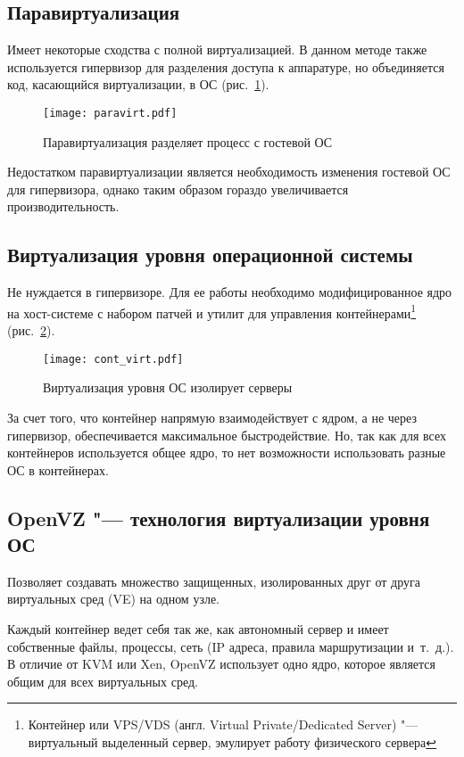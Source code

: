 \subsection{Паравиртуализация}
Имеет некоторые сходства с полной виртуализацией. 
В данном методе также используется гипервизор для разделения доступа к аппаратуре, но объединяется код, касающийся виртуализации, в ОС \cite{virtuallinux} (рис.~\ref{pic:paravirt}).
\begin{figure}[ht]
    \centering
	\texttt{[image: paravirt.pdf]}
	\caption{Паравиртуализация разделяет процесс с гостевой ОС}\label{pic:paravirt}
\end{figure}

Недостатком паравиртуализации является необходимость изменения гостевой ОС для гипервизора, однако таким образом гораздо увеличивается производительность.

\subsection{Виртуализация уровня операционной системы}
Не нуждается в гипервизоре. 
Для ее работы необходимо модифицированное ядро на хост-системе с набором патчей и утилит для управления контейнерами\footnote{Контейнер или VPS/VDS (англ. Virtual Private/Dedicated Server) "--- виртуальный выделенный сервер, эмулирует работу физического сервера} (рис.~\ref{pic:cont_virt}).
\begin{figure}[ht]
    \centering
	\texttt{[image: cont\_virt.pdf]}
	\caption{Виртуализация уровня ОС изолирует серверы}\label{pic:cont_virt}
\end{figure}

За счет того, что контейнер напрямую взаимодействует с ядром, а не через гипервизор, обеспечивается максимальное быстродействие. Но, так как для всех контейнеров используется общее ядро, то нет возможности использовать разные ОС в контейнерах.

\subsection{OpenVZ "--- технология виртуализации уровня ОС}
Позволяет создавать множество защищенных, изолированных друг от друга виртуальных сред (VE) на одном узле. 

Каждый контейнер ведет себя так же, как автономный сервер и имеет собственные файлы, процессы, сеть (IP адреса, правила маршрутизации и~т.~д.).
В отличие от KVM или Xen, OpenVZ использует одно ядро, которое является общим для всех виртуальных сред.

